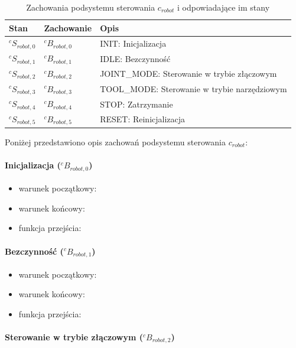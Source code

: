 \documentclass[a4paper, 12pt, twoside]{article}
\begin{document}
\begin{table}[htb!]
\label{behaviour_robot}
\begin{center}
\caption{Zachowania podsystemu sterowania $c_{robot}$ i odpowiadające im stany}
\begin{tabular}{ | l | l | l |}
\hline
 Stan & Zachowanie & Opis \\ 
\hline
 $^cS_{robot,0}$ & $^cB_{robot,0}$ & INIT: Inicjalizacja  \\ 
\hline
 $^cS_{robot,1}$ & $^cB_{robot,1}$ & IDLE: Bezczynność \\
\hline
 $^cS_{robot,2}$ & $^cB_{robot,2}$ & JOINT\_MODE: Sterowanie w trybie złączowym \\
\hline
 $^cS_{robot,3}$ & $^cB_{robot,3}$ & TOOL\_MODE: Sterowanie w trybie narzędziowym \\
\hline
 $^cS_{robot,4}$ & $^cB_{robot,4}$ & STOP: Zatrzymanie \\
\hline
 $^cS_{robot,5}$ & $^cB_{robot,5}$ & RESET: Reinicjalizacja \\
\hline
\end{tabular}
\end{center}
\end{table}

Poniżej przedstawiono opis zachowań podsystemu sterowania $c_{robot}$:

\paragraph{Inicjalizacja ($^cB_{robot,0}$)}

\begin{itemize}
\item warunek początkowy: 
\item warunek końcowy:
\item funkcja przejścia:
\end{itemize}

\paragraph{Bezczynność ($^cB_{robot,1}$)}

\begin{itemize}
\item warunek początkowy: 
\item warunek końcowy:
\item funkcja przejścia:
\end{itemize}

\paragraph{Sterowanie w trybie złączowym ($^cB_{robot,2}$)}
\end{document}
